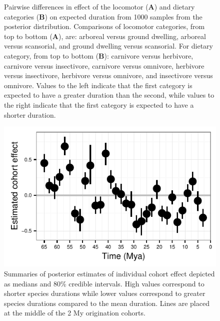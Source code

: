 \documentclass[12pt]{article}
\begin{document}
\begin{figure}[ht]
  \caption{Pairwise differences in effect of the locomotor (\textbf{A}) and dietary categories (\textbf{B}) on expected duration from 1000 samples from the posterior distribution. Comparisons of locomotor categories, from top to bottom (\textbf{A}), are: arboreal versus ground dwelling, arboreal versus scansorial, and ground dwelling versus scansorial. For dietary category, from top to bottom (\textbf{B}): carnivore versus herbivore, carnivore versus insectivore, carnivore versus omnivore, herbivore versus insectivore, herbivore versus omnivore, and insectivore versus omnivore. Values to the left indicate that the first category is expected to have a greater duration than the second, while values to the right indicate that the first category is expected to have a shorter duration.}
  \label{fig:trait_est}
\end{figure}

\begin{figure}[ht]
  \centering
  \includegraphics[height = 0.5\textheight, width = \textwidth, keepaspectratio = true]{figure/cohort_est}
  \caption{Summaries of posterior estimates of individual cohort effect depicted as medians and 80\% credible intervals. High values correspond to shorter species durations while lower values correspond to greater species durations compared to the mean duration. Lines are placed at the middle of the 2 My origination cohorts.}
  \label{fig:eff_cohort}
\end{figure}
\end{document}
